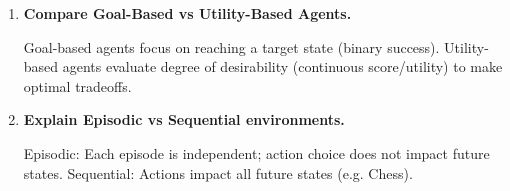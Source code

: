 \documentclass[12pt,a4paper]{article}
\newcommand{\Q}[1]{\textbf{#1}\par\noindent\ignorespaces}
\begin{document}
\begin{tcolorbox}[exambox, title={\textbf{Frequently Asked / Viva Questions}}]
\begin{enumerate}[topsep=0pt, label=\textbf{Q\arabic*.}, itemsep=5pt]
    \item \Q{Compare Goal-Based vs Utility-Based Agents.}
    Goal-based agents focus on reaching a target state (binary success). Utility-based agents evaluate degree of desirability (continuous score/utility) to make optimal tradeoffs.

    \item \Q{Explain Episodic vs Sequential environments.}
    Episodic: Each episode is independent; action choice does not impact future states. Sequential: Actions impact all future states (e.g. Chess).
  \end{enumerate}
\end{tcolorbox}
\end{document}
